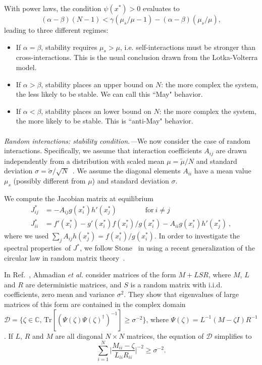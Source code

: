 \documentclass[
 prl,
 twocolumn,
 amsmath,
 amssymb,
 aps,
]{revtex4-2}
\begin{document}
With power laws, the condition $\psi(x^*)>0$ evaluates to 
\begin{equation}
    (\alpha - \beta)(N-1) < \gamma(\mu_s/\mu- 1) - (\alpha - \beta)(\mu_s/\mu),
\end{equation}
leading to three different regimes:
\begin{itemize}
    \item If $\alpha = \beta$, stability requires $\mu_s > \mu$, i.e.
    self-interactions must be stronger than cross-interactions.
    This is the usual conclusion drawn from the Lotka-Volterra model.
    \item If $\alpha > \beta$, stability places an upper bound on $N$: the more complex the system, the less likely to be stable.
    We can call this ``May" behavior.
    \item If $\alpha < \beta$, stability places an lower bound on $N$: the more complex the system, the more likely to be stable.
    This is ``anti-May" behavior.
\end{itemize}

\paragraph*{}
\emph{Random interactions: stability condition.---}We now consider the case of random interactions.
Specifically, we assume that interaction coefficients $A_{ij}$ are drawn independently from a distribution with scaled mean $\mu=\tilde{\mu}/N$ and standard deviation $\sigma=\tilde{\sigma}/\sqrt{N}$~\cite{bunin2017ecological}.
We assume the diagonal elements $A_{ii}$ have a mean value $\mu_s$ (possibly different from $\mu$) and standard deviation $\sigma$. 
 
We compute the Jacobian matrix at equilibrium
\begin{align}
    J_{ij}^* & = - A_{ij}g(x_i^*)h'(x_j^*) \qquad \qquad \textrm{for} \ i\neq j \label{eq: jac off-diag}\\
    J_{ii}^* & = f'(x_i^*) - g'(x_i^*)f(x_i^*)/g(x_i^*) - A_{ii}g(x_i^*)h'(x_j^*) \ , \label{eq: jac diag}
\end{align}
where we used $\sum_{j}A_{ij}h(x_j^*)=f(x_i^*)/g(x_i^*)$.
In order to investigate the spectral properties of $J^*$, 
we follow Stone~\cite{Stone2018} in using a recent generalization of the circular law in random matrix theory~\cite{Ahmadian2015}.

In Ref.~\cite{Ahmadian2015}, Ahmadian \emph{et al.} consider matrices of the form $M + LSR$, where $M$,  
$L$ and $R$ are deterministic matrices, and $S$ is a random matrix with i.i.d. coefficients, zero mean and variance $\sigma^2$.
They show that eigenvalues of large matrices of this form are contained in the complex domain $\mathcal{D} = \{\zeta \in \mathbb{C},\, \textrm{Tr}[(\Psi(\zeta) \Psi(\zeta)^\dagger)^{-1}]\geq \sigma^{-2}\}$, where $\Psi(\zeta) = L^{-1}(M-\zeta I)R^{-1}$. If $L$, $R$ and $M$ are all diagonal $N\times N$ matrices, the equation of $\mathcal{D}$ simplifies to 
\begin{equation}
    \sum_{i=1}^N\Big\vert\frac{M_{ii} - \zeta}{L_{ii}R_{ii}}\Big\vert^{-2}\geq \sigma^{-2}.
\label{eq: domain}
\end{equation}
\end{document}

